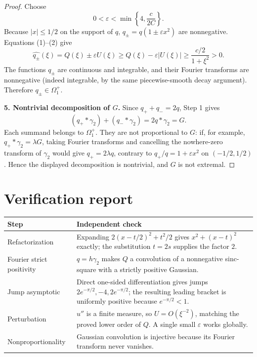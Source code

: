 \documentclass[11pt]{article}
\newcommand{\Om}{\Omega_1^+}
\begin{document}
\begin{proof}
Choose
\[
 0<\varepsilon<\min\left\{4,\frac{c}{2C}\right\}.
\]
Because $|x|\leq1/2$ on the support of $q$,
$q_\pm=q(1\pm\varepsilon x^2)$ are nonnegative.  Equations (1)--(2) give
\[
 \widehat{q_\pm}(\xi)=Q(\xi)\pm\varepsilon U(\xi)
 \geq Q(\xi)-\varepsilon|U(\xi)|
 \geq\frac{c/2}{1+\xi^2}>0.
\]
The functions $q_\pm$ are continuous and integrable, and their Fourier
transforms are nonnegative (indeed integrable, by the same piecewise-smooth
decay argument).  Therefore $q_\pm\in\Om$.

\textbf{5. Nontrivial decomposition of $G$.}
Since $q_++q_-=2q$, Step 1 gives
\[
 (q_+*\gamma_2)+(q_-*\gamma_2)
 =2q*\gamma_2=G.
\]
Each summand belongs to $\Om$.  They are not proportional to $G$: if, for
example, $q_+*\gamma_2=\lambda G$, taking Fourier transforms and cancelling
the nowhere-zero transform of $\gamma_2$ would give
$q_+=2\lambda q$, contrary to $q_+/q=1+\varepsilon x^2$ on
$(-1/2,1/2)$.  Hence the displayed decomposition is nontrivial, and $G$ is
not extremal.
\end{proof}

\section*{Verification report}

\begin{center}
\begin{tabular}{>{\raggedright\arraybackslash}p{}>{\raggedright\arraybackslash}p{}}
\textbf{Step} & \textbf{Independent check}\\ \hline
Refactorization & Expanding
$2(x-t/2)^2+t^2/2$ gives $x^2+(x-t)^2$ exactly; the substitution
$t=2s$ supplies the factor $2$.\\
Fourier strict positivity & $q=h\gamma_2$ makes $Q$ a convolution of a
nonnegative sinc-square with a strictly positive Gaussian.\\
Jump asymptotic & Direct one-sided differentiation gives jumps
$2e^{-\pi/2},-4,2e^{-\pi/2}$; the resulting leading bracket is uniformly
positive because $e^{-\pi/2}<1$.\\
Perturbation & $u''$ is a finite measure, so $U=O(\xi^{-2})$, matching the
proved lower order of $Q$.  A single small $\varepsilon$ works globally.\\
Nonproportionality & Gaussian convolution is injective because its Fourier
transform never vanishes.\\
\end{tabular}
\end{center}
\end{document}
